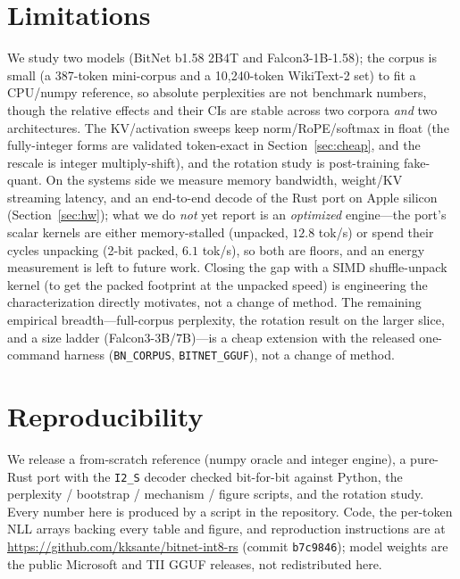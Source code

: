 \documentclass[11pt]{article}
\begin{document}
\section{Limitations}
\label{sec:limits}
We study two models (BitNet b1.58 2B4T and Falcon3-1B-1.58); the corpus is small
(a 387-token mini-corpus and a 10{,}240-token WikiText-2 set) to fit a CPU/numpy
reference, so absolute perplexities are not benchmark numbers, though the relative
effects and their CIs are stable across two corpora \emph{and} two architectures.
The KV/activation sweeps keep norm/RoPE/softmax in float (the fully-integer forms
are validated token-exact in Section~\ref{sec:cheap}, and the rescale is integer
multiply-shift), and the rotation study is post-training fake-quant. On the systems
side we measure memory bandwidth, weight/KV streaming latency, and an end-to-end
decode of the Rust port on Apple silicon (Section~\ref{sec:hw}); what we do
\emph{not} yet report is an \emph{optimized} engine---the port's scalar kernels are
either memory-stalled (unpacked, $12.8$ tok/s) or spend their cycles unpacking
(2-bit packed, $6.1$ tok/s), so both are floors, and an energy measurement is left to
future work. Closing the gap with a SIMD shuffle-unpack kernel (to get the packed
footprint at the unpacked speed) is engineering the characterization directly
motivates, not a change of method. The
remaining empirical breadth---full-corpus perplexity, the rotation result on the
larger slice, and a size ladder (Falcon3-3B/7B)---is a cheap extension with the
released one-command harness (\texttt{BN\_CORPUS}, \texttt{BITNET\_GGUF}), not a
change of method.

\section{Reproducibility}
\label{sec:repro}
We release a from-scratch reference (numpy oracle and integer engine), a pure-Rust
port with the \texttt{I2\_S} decoder checked bit-for-bit against Python, the
perplexity / bootstrap / mechanism / figure scripts, and the rotation study. Every
number here is produced by a script in the repository. Code, the per-token NLL
arrays backing every table and figure, and reproduction instructions are at
\url{https://github.com/kksante/bitnet-int8-rs} (commit \texttt{b7c9846}); model
weights are the public Microsoft and TII GGUF releases, not redistributed here.
\end{document}
